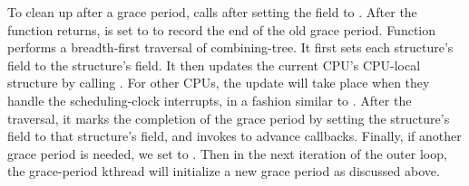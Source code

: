 To clean up after a grace period, 
calls  after setting the  field 
to . After the function returns,  is set to
 to record the end of the old grace period.
%
Function  performs a breadth-first traversal of
 combining-tree.
It first sets each  structure's  field
to the  structure's  field.
It then updates the current CPU's CPU-local  structure by
calling .
For other CPUs, the update will take place when they handle the scheduling-clock
interrupts, in a fashion similar to .
After the traversal, it marks the completion of the grace period by setting the
 structure's 
field to that structure's  field, and invokes
 to advance callbacks.
%
Finally, if another grace period is needed,
we set  to .
Then in the next iteration of the outer loop, the grace-period kthread
will initialize a new grace period as discussed above.



